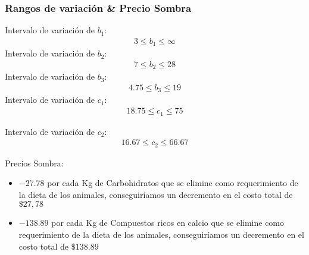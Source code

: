 \begin{homeworkProblem}
\subsubsection{Rangos de variación \& Precio Sombra}
Intervalo de variación de $b_1$:
\begin{align*}
    3 \le b_1 \le \infty
\end{align*}
Intervalo de variación de $b_2$:
\begin{align*}
    7 \le b_2 \le 28
\end{align*}
Intervalo de variación de $b_3$:
\begin{align*}
    4.75 \le b_3 \le 19
\end{align*}
Intervalo de variación de $c_1$: 
\begin{align*}
    18.75 \le c_1 \le 75
\end{align*}

Intervalo de variación de $c_2$: 
\begin{align*}
    16.67 \le c_2 \le 66.67
\end{align*}

Precios Sombra:
\begin{itemize}
    \item $-27.78$ por cada Kg de Carbohidratos que se elimine como requerimiento de la dieta de los animales, conseguiríamos un decremento en el costo total de $\$27,78$
    \item $-138.89$ por cada Kg de Compuestos ricos en calcio que se elimine como requerimiento de la dieta de los animales, conseguiríamos un decremento en el costo total de $\$138.89$
\end{itemize}
\end{homeworkProblem}